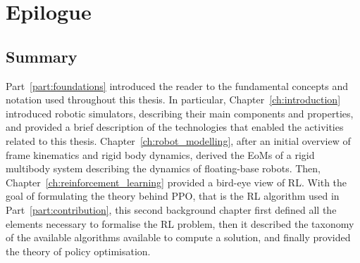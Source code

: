 {}

\acresetall
\chapter*{Epilogue}

\section*{Summary}

Part~\ref{part:foundations} introduced the reader to the fundamental concepts and notation used throughout this thesis.
In particular, Chapter~\ref{ch:introduction} introduced robotic simulators, describing their main components and properties, and provided a brief description of the technologies that enabled the activities related to this thesis.
Chapter~\ref{ch:robot_modelling}, after an initial overview of frame kinematics and rigid body dynamics, derived the \acp{EoM} of a rigid multibody system describing the dynamics of floating-base robots.
Then, Chapter~\ref{ch:reinforcement_learning} provided a bird-eye view of \ac{RL}.
With the goal of formulating the theory behind \ac{PPO}, that is the \ac{RL} algorithm used in Part~\ref{part:contribution}, this second background chapter first defined all the elements necessary to formalise the \ac{RL} problem, then it described the taxonomy of the available algorithms available to compute a solution, and finally provided the theory of policy optimisation.

